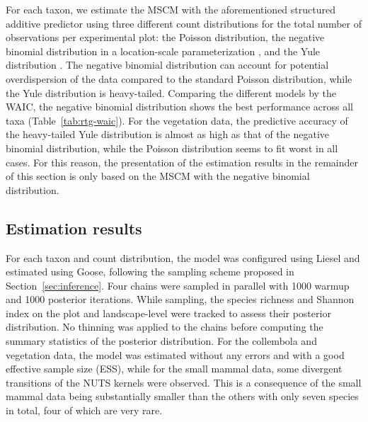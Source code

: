 \documentclass{article}
\begin{document}
For each taxon, we estimate the MSCM with the aforementioned structured additive predictor using three different count distributions for the total number of observations per experimental plot: the Poisson distribution, the negative binomial distribution in a location-scale parameterization \citep[Chapter~22.2.3]{rigbyDistributions2019}, and the Yule distribution \citep[Chapter~22.1.4]{rigbyDistributions2019}. The negative binomial distribution can account for potential overdispersion of the data compared to the standard Poisson distribution, while the Yule distribution is heavy-tailed. Comparing the different models by the WAIC, the negative binomial distribution shows the best performance across all taxa (Table~\ref{tab:rtg-waic}). For the vegetation data, the predictive accuracy of the heavy-tailed Yule distribution is almost as high as that of the negative binomial distribution, while the Poisson distribution seems to fit worst in all cases. For this reason, the presentation of the estimation results in the remainder of this section is only based on the MSCM with the negative binomial distribution.

\subsection{Estimation results}
\label{sec:results}

For each taxon and count distribution, the model was configured using Liesel and estimated using Goose, following the sampling scheme proposed in Section~\ref{sec:inference}. Four chains were sampled in parallel with 1000 warmup and 1000 posterior iterations. While sampling, the species richness and Shannon index on the plot and landscape-level were tracked to assess their posterior distribution. No thinning was applied to the chains before computing the summary statistics of the posterior distribution. For the collembola and vegetation data, the model was estimated without any errors and with a good effective sample size (ESS), while for the small mammal data, some divergent transitions of the NUTS kernels were observed. This is a consequence of the small mammal data being substantially smaller than the others with only seven species in total, four of which are very rare.
\end{document}
